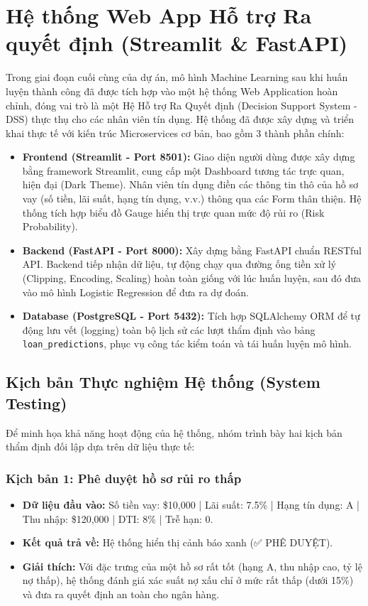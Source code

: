 \section{Hệ thống Web App Hỗ trợ Ra quyết định (Streamlit \& FastAPI)}

Trong giai đoạn cuối cùng của dự án, mô hình Machine Learning sau khi huấn luyện thành công đã được tích hợp vào một hệ thống Web Application hoàn chỉnh, đóng vai trò là một Hệ Hỗ trợ Ra Quyết định (Decision Support System - DSS) thực thụ cho các nhân viên tín dụng. Hệ thống đã được xây dựng và triển khai thực tế với kiến trúc Microservices cơ bản, bao gồm 3 thành phần chính:

\begin{itemize}
    \item \textbf{Frontend (Streamlit - Port 8501):} Giao diện người dùng được xây dựng bằng framework Streamlit, cung cấp một Dashboard tương tác trực quan, hiện đại (Dark Theme). Nhân viên tín dụng điền các thông tin thô của hồ sơ vay (số tiền, lãi suất, hạng tín dụng, v.v.) thông qua các Form thân thiện. Hệ thống tích hợp biểu đồ Gauge hiển thị trực quan mức độ rủi ro (Risk Probability).
    \item \textbf{Backend (FastAPI - Port 8000):} Xây dựng bằng FastAPI chuẩn RESTful API. Backend tiếp nhận dữ liệu, tự động chạy qua đường ống tiền xử lý (Clipping, Encoding, Scaling) hoàn toàn giống với lúc huấn luyện, sau đó đưa vào mô hình Logistic Regression để đưa ra dự đoán.
    \item \textbf{Database (PostgreSQL - Port 5432):} Tích hợp SQLAlchemy ORM để tự động lưu vết (logging) toàn bộ lịch sử các lượt thẩm định vào bảng \texttt{loan\_predictions}, phục vụ công tác kiểm toán và tái huấn luyện mô hình.
\end{itemize}

\subsection{Kịch bản Thực nghiệm Hệ thống (System Testing)}
Để minh họa khả năng hoạt động của hệ thống, nhóm trình bày hai kịch bản thẩm định đối lập dựa trên dữ liệu thực tế:

\subsubsection{Kịch bản 1: Phê duyệt hồ sơ rủi ro thấp}
\begin{itemize}
    \item \textbf{Dữ liệu đầu vào:} Số tiền vay: \$10,000 | Lãi suất: 7.5\% | Hạng tín dụng: A | Thu nhập: \$120,000 | DTI: 8\% | Trễ hạn: 0.
    \item \textbf{Kết quả trả về:} Hệ thống hiển thị cảnh báo xanh (✅ PHÊ DUYỆT).
    \item \textbf{Giải thích:} Với đặc trưng của một hồ sơ rất tốt (hạng A, thu nhập cao, tỷ lệ nợ thấp), hệ thống đánh giá xác suất nợ xấu chỉ ở mức rất thấp (dưới 15\%) và đưa ra quyết định an toàn cho ngân hàng.
\end{itemize}

